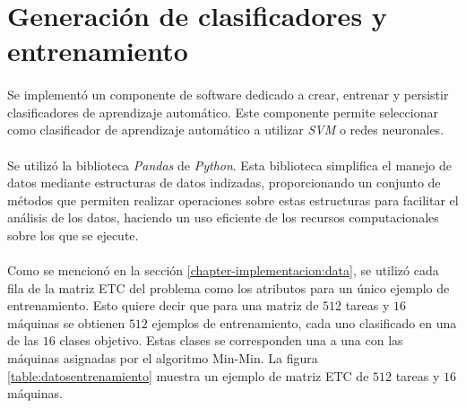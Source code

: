 \section{Generación de clasificadores y entrenamiento} \label{chapter-implementacion:clasificadores}

\paragraph{} Se implementó un componente de software dedicado a crear, entrenar y persistir clasificadores de aprendizaje automático.
Este componente permite seleccionar como clasificador de aprendizaje automático a utilizar \textit{SVM} o redes neuronales.

\paragraph{} Se utilizó la biblioteca \textit{Pandas}\cite{bib-pandas} de \textit{Python}.
Esta biblioteca simplifica el manejo de datos mediante estructuras de datos indizadas, proporcionando un conjunto de métodos que permiten realizar operaciones sobre estas estructuras para facilitar el análisis de los datos, haciendo un uso eficiente de los recursos computacionales sobre los que se ejecute.

\paragraph{} Como se mencionó en la sección \ref{chapter-implementacion:data}, se utilizó cada fila de la matriz ETC del problema como los atributos para un único ejemplo de entrenamiento.
Esto quiere decir que para una matriz de $512$ tareas y $16$ máquinas se obtienen $512$ ejemplos de entrenamiento, cada uno clasificado en una de las $16$ clases objetivo.
Estas clases se corresponden una a una con las máquinas asignadas por el algoritmo Min-Min.
La figura \ref{table:datosentrenamiento} muestra un ejemplo de matriz ETC de $512$ tareas y $16$ máquinas.

